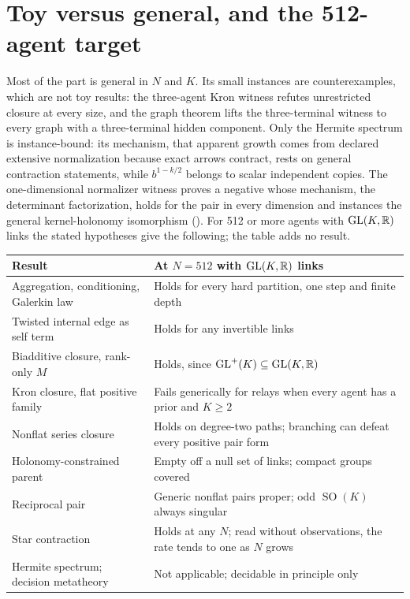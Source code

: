\section{Toy versus general, and the 512-agent target}
\label{comp:sg2-toy}

Most of the part is general in \(N\) and \(K\). Its small instances are counterexamples, which are not toy results: the
three-agent Kron witness refutes unrestricted closure at every size, and the graph theorem lifts the three-terminal
witness to every graph with a three-terminal hidden component. Only the Hermite spectrum is instance-bound: its
mechanism, that apparent growth comes from declared extensive normalization because exact arrows contract, rests on
general contraction statements, while \(b^{1-k/2}\) belongs to scalar independent copies. The one-dimensional
normalizer witness proves a negative whose mechanism, the determinant factorization, holds for the pair in every
dimension and instances the general kernel-holonomy isomorphism (). For 512 or more agents
with \(\mathrm{GL}(K,\mathbb R)\) links the stated hypotheses give the following; the table adds no result.

{\small\renewcommand{\arraystretch}{1.15}
\begin{longtable}{@{}>{\raggedright\arraybackslash}p{}>{\raggedright\arraybackslash}p{}@{}}
\toprule
\textbf{Result} & \textbf{At \(N=512\) with \(\mathrm{GL}(K,\mathbb R)\) links}\\
\midrule\endhead
\bottomrule\endfoot
Aggregation, conditioning, Galerkin law & Holds for every hard partition, one step and finite depth\\
Twisted internal edge as self term & Holds for any invertible links\\
Biadditive closure, rank-only \(M\) & Holds, since \(\mathrm{GL}^+(K)\subseteq\mathrm{GL}(K,\mathbb R)\)\\
Kron closure, flat positive family & Fails generically for relays when every agent has a prior and \(K\geq2\)\\
Nonflat series closure & Holds on degree-two paths; branching can defeat every positive pair form\\
Holonomy-constrained parent & Empty off a null set of links; compact groups covered\\
Reciprocal pair & Generic nonflat pairs proper; odd \(\operatorname{SO}(K)\) always singular\\
Star contraction & Holds at any \(N\); read without observations, the rate tends to one as \(N\) grows\\
Hermite spectrum; decision metatheory & Not applicable; decidable in principle only\\
\end{longtable}}

